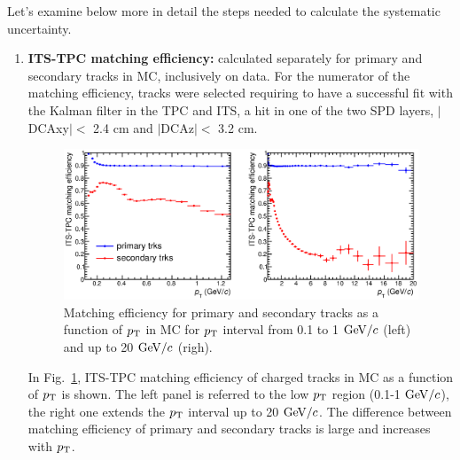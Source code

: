 Let's examine below more in detail the steps needed to 
calculate the systematic uncertainty.
\begin{enumerate}
\item {\bf ITS-TPC matching efficiency:} calculated separately for 
primary and secondary tracks in MC, inclusively on data. For 
the numerator of the matching efficiency, tracks were selected requiring 
to have a successful fit with the Kalman filter in the TPC and ITS, a hit in one of the two SPD layers, 
$|$DCAxy$|<$ 2.4 cm and $|$DCAz$|<$ 3.2 cm.
\begin{figure}[!htb]
\centering
\includegraphics[width=1\textwidth]{FigCap4/ITSTPC_matchEff_vsPt_LowFullpt.eps}
\caption{Matching efficiency for primary and secondary tracks as a function of $p_{\rm T}$ in MC for $p_{\rm T}$ interval from 0.1 to 1 $\mathrm{GeV}/c$ (left) and up to 20 $\mathrm{GeV}/c$ (righ). }
\label{fig:matcheff_pt}
\end{figure}

In Fig.~\ref{fig:matcheff_pt}, ITS-TPC matching efficiency 
of charged tracks in MC as a function of 
$p_{\rm T}$ is shown. The left panel is referred to the low $p_{\rm T}$ region (0.1-1 $\mathrm{GeV}/c$), 
the right one extends the $p_{\rm T}$ interval up to 20 $\mathrm{GeV}/c$. 
The difference between matching efficiency of primary and secondary tracks
is large and increases with $p_{\rm T}$.


\end{enumerate}
